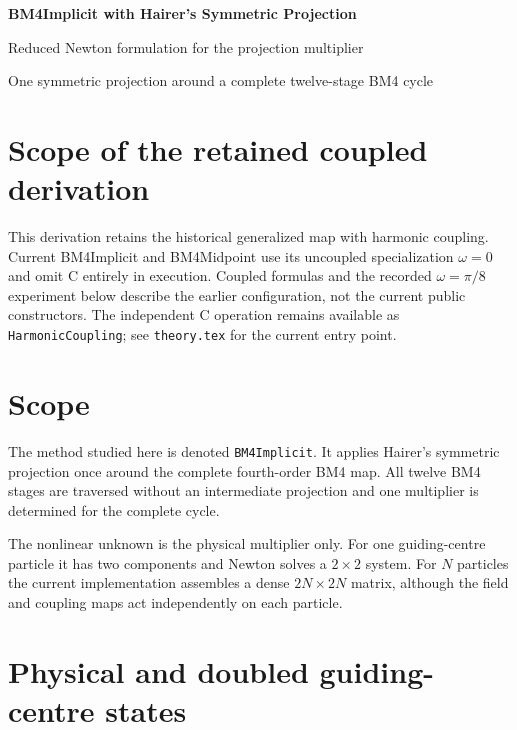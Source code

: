 \documentclass[11pt,a4paper]{article}
\begin{document}
\begin{center}
  {\LARGE\bfseries\color{blue}BM4Implicit with Hairer's Symmetric Projection}\par
  \vspace{0.35em}
  {\large Reduced Newton formulation for the projection multiplier}\par
  \vspace{0.45em}
  {\small One symmetric projection around a complete twelve-stage BM4 cycle}
\end{center}

\vspace{0.5em}

\section*{Scope of the retained coupled derivation}
This derivation retains the historical generalized map with harmonic coupling.
Current BM4Implicit and BM4Midpoint use its uncoupled specialization
$\omega=0$ and omit C entirely in execution. Coupled formulas and the recorded
$\omega=\pi/8$ experiment below describe the earlier configuration, not the
current public constructors. The independent C operation remains available
as \texttt{HarmonicCoupling}; see \texttt{theory.tex} for the current entry point.

\section{Scope}

The method studied here is denoted \texttt{BM4Implicit}.  It applies Hairer's
symmetric projection once around the complete fourth-order BM4 map.  All
twelve BM4 stages are traversed without an intermediate projection and one
multiplier is determined for the complete cycle.

The nonlinear unknown is the physical multiplier only.  For one guiding-centre
particle it has two components and Newton solves a $2\times2$ system.  For $N$
particles the current implementation assembles a dense $2N\times2N$ matrix,
although the field and coupling maps act independently on each particle.

\section{Physical and doubled guiding-centre states}
\end{document}
